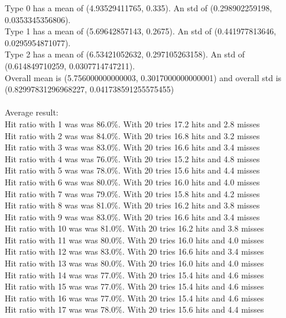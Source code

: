 \documentclass{article}
\begin{document}
Type 0 has a mean of (4.93529411765, 0.335). An std of (0.298902259198, 0.0353345356806).\\
Type 1 has a mean of (5.69642857143, 0.2675). An std of (0.441977813646, 0.0295954871077).\\
Type 2 has a mean of (6.53421052632, 0.297105263158). An std of (0.614849710259, 0.0307714747211).\\
Overall mean is (5.756000000000003, 0.3017000000000001) and overall std is (0.82997831296968227, 0.041738591255575455)\\\\
Average result: \\
Hit ratio with 1 was   was 86.0\%. With 20 tries 17.2 hits and 2.8 misses\\
Hit ratio with 2 was   was 84.0\%. With 20 tries 16.8 hits and 3.2 misses\\
Hit ratio with 3 was   was 83.0\%. With 20 tries 16.6 hits and 3.4 misses\\
Hit ratio with 4 was   was 76.0\%. With 20 tries 15.2 hits and 4.8 misses\\
Hit ratio with 5 was   was 78.0\%. With 20 tries 15.6 hits and 4.4 misses\\
Hit ratio with 6 was   was 80.0\%. With 20 tries 16.0 hits and 4.0 misses\\
Hit ratio with 7 was   was 79.0\%. With 20 tries 15.8 hits and 4.2 misses\\
Hit ratio with 8 was   was 81.0\%. With 20 tries 16.2 hits and 3.8 misses\\
Hit ratio with 9 was   was 83.0\%. With 20 tries 16.6 hits and 3.4 misses\\
Hit ratio with 10 was  was 81.0\%. With 20 tries 16.2 hits and 3.8 misses\\
Hit ratio with 11 was  was 80.0\%. With 20 tries 16.0 hits and 4.0 misses\\
Hit ratio with 12 was  was 83.0\%. With 20 tries 16.6 hits and 3.4 misses\\
Hit ratio with 13 was  was 80.0\%. With 20 tries 16.0 hits and 4.0 misses\\
Hit ratio with 14 was  was 77.0\%. With 20 tries 15.4 hits and 4.6 misses\\
Hit ratio with 15 was  was 77.0\%. With 20 tries 15.4 hits and 4.6 misses\\
Hit ratio with 16 was  was 77.0\%. With 20 tries 15.4 hits and 4.6 misses\\
Hit ratio with 17 was  was 78.0\%. With 20 tries 15.6 hits and 4.4 misses\\
\end{document}
